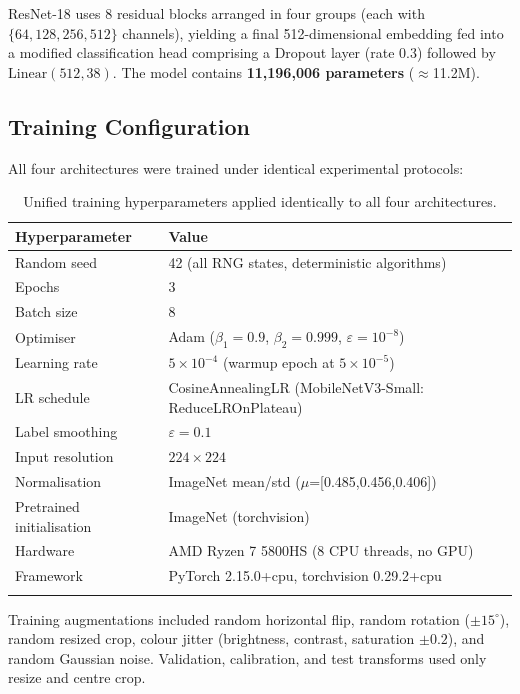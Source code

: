 \documentclass[pdflatex,sn-mathphys-num]{sn-jnl}
\theoremstyle{thmstyleone}%
\theoremstyle{thmstyletwo}%
\theoremstyle{thmstylethree}%
\begin{document}
ResNet-18 uses 8 residual blocks arranged in four groups (each with $\{64, 128, 256, 512\}$ channels), yielding a final 512-dimensional embedding fed into a modified
classification head comprising a Dropout layer (rate 0.3) followed by
$\text{Linear}(512, 38)$. The model contains \textbf{11{,}196{,}006 parameters}
($\approx$11.2M).

\subsection{Training Configuration}
\label{sec:training_config}

All four architectures were trained under identical experimental protocols:

\begin{table}[h]
\caption{Unified training hyperparameters applied identically to all four architectures.}\label{tab:training_config}%
\begin{tabular*}{\textwidth}{@{\extracolsep\fill}ll}
\toprule
\textbf{Hyperparameter} & \textbf{Value} \\
\midrule
Random seed & 42 (all RNG states, deterministic algorithms) \\
Epochs & 3 \\
Batch size & 8 \\
Optimiser & Adam ($\beta_1=0.9$, $\beta_2=0.999$, $\varepsilon=10^{-8}$) \\
Learning rate & $5 \times 10^{-4}$ (warmup epoch at $5 \times 10^{-5}$) \\
LR schedule & CosineAnnealingLR (MobileNetV3-Small: ReduceLROnPlateau) \\
Label smoothing & $\varepsilon = 0.1$ \\
Input resolution & $224 \times 224$ \\
Normalisation & ImageNet mean/std ($\mu$=[0.485,0.456,0.406]) \\
Pretrained initialisation & ImageNet (torchvision) \\
Hardware & AMD Ryzen 7 5800HS (8 CPU threads, no GPU) \\
Framework & PyTorch 2.15.0+cpu, torchvision 0.29.2+cpu \\
\botrule
\end{tabular*}
\end{table}

\noindent Training augmentations included random horizontal flip, random rotation
($\pm 15^\circ$), random resized crop, colour jitter (brightness, contrast, saturation
$\pm0.2$), and random Gaussian noise. Validation, calibration, and test transforms
used only resize and centre crop.
\end{document}
